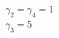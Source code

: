 \documentclass[preview]{standalone}
\begin{document}
\begin{center}
$\gamma_2 = \gamma_4 = 1$\\$\gamma_3 = 5$
\end{center}
\end{document}
